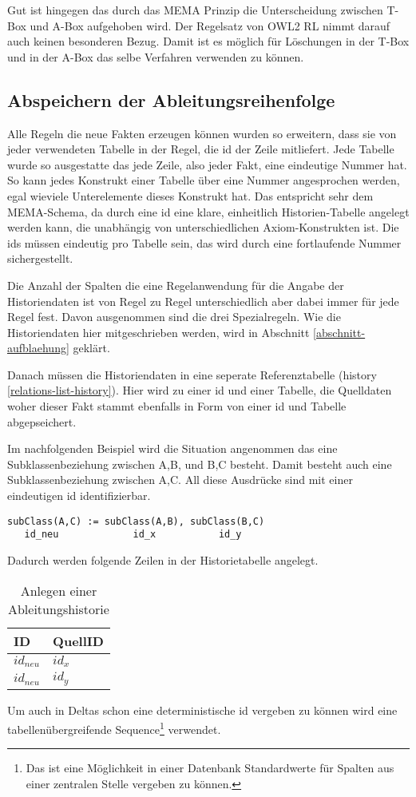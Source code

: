 Gut ist hingegen das durch das MEMA Prinzip die Unterscheidung zwischen T-Box und A-Box aufgehoben wird. Der Regelsatz von OWL2 RL nimmt darauf auch keinen besonderen Bezug. Damit ist es möglich für Löschungen in der T-Box und in der A-Box das selbe Verfahren verwenden zu können.

\subsection{Abspeichern der Ableitungsreihenfolge}
Alle Regeln die neue Fakten erzeugen können wurden so erweitern, dass sie von jeder verwendeten Tabelle in der Regel, die id der Zeile mitliefert. Jede Tabelle wurde so ausgestatte das jede Zeile, also jeder Fakt, eine eindeutige Nummer hat. So kann jedes Konstrukt einer Tabelle über eine Nummer angesprochen werden, egal wieviele Unterelemente dieses Konstrukt hat. Das entspricht sehr dem MEMA-Schema, da durch eine id eine klare, einheitlich Historien-Tabelle angelegt werden kann, die unabhängig von unterschiedlichen Axiom-Konstrukten ist. Die ids müssen eindeutig pro Tabelle sein, das wird durch eine fortlaufende Nummer sichergestellt.

Die Anzahl der Spalten die eine Regelanwendung für die Angabe der Historiendaten ist von Regel zu Regel unterschiedlich aber dabei immer für jede Regel fest. Davon ausgenommen sind die drei Spezialregeln. Wie die Historiendaten hier mitgeschrieben werden, wird in Abschnitt \ref{abschnitt-aufblaehung} geklärt.

Danach müssen die Historiendaten in eine seperate Referenztabelle (history \ref{relations-list-history}). Hier wird zu einer id und einer Tabelle, die Quelldaten woher dieser Fakt stammt ebenfalls in Form von einer id und Tabelle abgepseichert.

Im nachfolgenden Beispiel wird die Situation angenommen das eine Subklassenbeziehung zwischen A,B, und B,C besteht. Damit besteht auch eine Subklassenbeziehung zwischen A,C. All diese Ausdrücke sind mit einer eindeutigen id identifizierbar.
\begin{verbatim}
subClass(A,C) := subClass(A,B), subClass(B,C)
   id_neu             id_x           id_y
\end{verbatim}

Dadurch werden folgende Zeilen in der Historietabelle angelegt.

\begin{table}[htb]
\begin{center}
\begin{tabular}{l|l}
ID & QuellID \\ \hline
$id_{neu}$ & $id_x$ \\
$id_{neu}$ & $id_y$
\end{tabular}
\end{center}
\caption{Anlegen einer Ableitungshistorie}
\label{table-inference-history}
\end{table}
Um auch in Deltas schon eine deterministische id vergeben zu können wird eine tabellenübergreifende Sequence\footnote{Das ist eine Möglichkeit in einer Datenbank Standardwerte für Spalten aus einer zentralen Stelle vergeben zu können.} verwendet.

